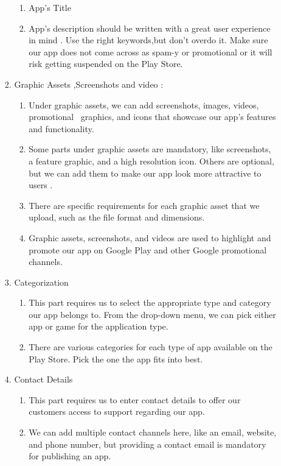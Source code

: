 \begin{enumerate}
\begin{enumerate}
\begin{enumerate}
\begin{enumerate}
                \item App’s Title
                \item App’s description should be written with a great user experience in mind . Use the right keywords,but don’t overdo it. Make sure our app does not come across as spam-y or promotional
                or it will risk getting suspended on the Play Store.
            \end{enumerate}
            \item Graphic Assets ,Screenshots and video :
            \begin{enumerate}
                \item Under graphic assets, we can add screenshots, images, videos, promotional  graphics, and icons that showcase our app’s features and functionality. 
                \item Some parts under graphic assets are mandatory, like screenshots, a feature graphic, and a high resolution icon. Others are optional, but we can add them to make our app look more attractive to users .
                 \item There are specific requirements for each graphic asset that we upload, such as the file format and dimensions.
                \item Graphic assets, screenshots, and videos are used to highlight and promote our app on Google Play and other Google promotional channels.
            \end{enumerate}
            \item Categorization
            \begin{enumerate}
                \item This part requires us to select the appropriate type and category our app belongs to. From the drop-down menu, we can pick either app or game for the application type.
                \item There are various categories for each type of app available on the Play Store. Pick the one the app fits into best.
            \end{enumerate}
            \item Contact Details
            \begin{enumerate}
                \item This part requires us to enter contact details to offer our customers access to support regarding our app.
                \item We can add multiple contact channels here, like an email, website, and phone number, but providing a contact email is mandatory for publishing an app.

\end{enumerate}
\end{enumerate}
\end{enumerate}
\end{enumerate}
